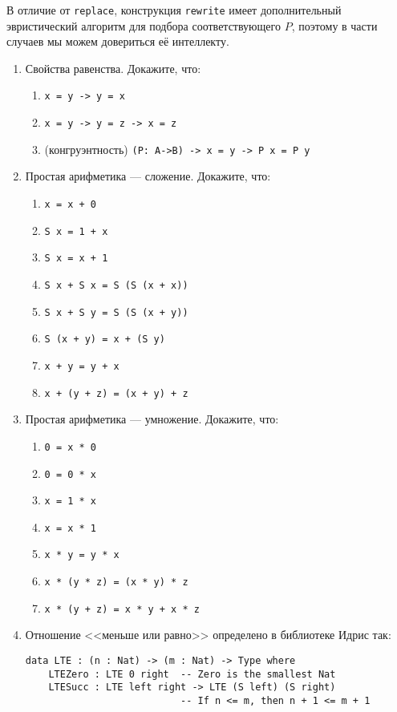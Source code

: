 \documentclass[10pt,a4paper,oneside]{article}
\begin{document}
В отличие от \verb!replace!, конструкция \verb!rewrite! имеет дополнительный
эвристический алгоритм для подбора соответствующего $P$, поэтому в части случаев 
мы можем довериться её интеллекту.

\begin{enumerate}
\item Свойства равенства. Докажите, что:
\begin{enumerate}
\item \verb!x = y -> y = x!
\item \verb!x = y -> y = z -> x = z!
\item (конгруэнтность) \verb!(P: A->B) -> x = y -> P x = P y!
\end{enumerate}

\item Простая арифметика --- сложение. Докажите, что:
\begin{enumerate} 
\item \verb!x = x + 0!
\item \verb!S x = 1 + x!
\item \verb!S x = x + 1!
\item \verb!S x + S x = S (S (x + x))!
\item \verb!S x + S y = S (S (x + y))!
\item \verb!S (x + y) = x + (S y)!
\item \verb!x + y = y + x!
\item \verb!x + (y + z) = (x + y) + z!
\end{enumerate}

\item Простая арифметика --- умножение. Докажите, что:
\begin{enumerate} 
\item \verb!0 = x * 0!
\item \verb!0 = 0 * x!
\item \verb!x = 1 * x!
\item \verb!x = x * 1!
\item \verb!x * y = y * x!
\item \verb!x * (y * z) = (x * y) * z!
\item \verb!x * (y + z) = x * y + x * z!
\end{enumerate}

\item Отношение <<меньше или равно>> определено в библиотеке Идрис так:

\begin{verbatim}
data LTE : (n : Nat) -> (m : Nat) -> Type where
    LTEZero : LTE 0 right  -- Zero is the smallest Nat
    LTESucc : LTE left right -> LTE (S left) (S right)
                           -- If n <= m, then n + 1 <= m + 1
\end{verbatim}


\end{enumerate}
\end{document}
